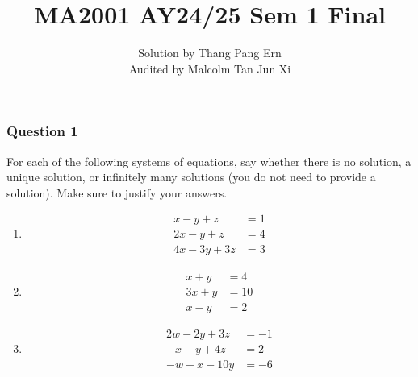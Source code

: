 \documentclass[12pt]{article}
\title{MA2001 AY24/25 Sem 1 Final}
\author{
  Solution by Thang Pang Ern\\
  Audited by Malcolm Tan Jun Xi
}
\date{}
\begin{document}
\maketitle
\subsubsection*{Question 1}
For each of the following systems of equations, say whether there is no solution, a unique solution, or infinitely many solutions (you do not need to provide a solution). Make sure to justify your answers.
\begin{enumerate}[label=\textbf{(\alph*)}]
\itemsep 0em
  \item
    \[
      \begin{aligned}
        x - y + z &= 1\\
        2x - y + z &= 4\\
        4x - 3y + 3z &= 3
      \end{aligned}
    \]

  \item
    \[
      \begin{aligned}
        x + y &= 4\\
        3x + y &= 10\\
        x - y &= 2
      \end{aligned}
    \]

  \item
    \[
      \begin{aligned}
        2w - 2y + 3z &= -1\\
        -x - y + 4z &= 2\\
        -w + x - 10y &= -6
      \end{aligned}
    \]
\end{enumerate}
\end{document}
